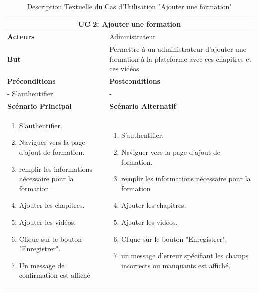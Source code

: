 \begin{table}[h!]
    \centering
    \begin{tabular}{| m{7cm} | m{7cm} |}
    \hline
    \multicolumn{2}{|c|}{\textbf{UC 2:} Ajouter une formation} \\ \hline
    \textbf{Acteurs} &  Administrateur \\ \hline
    \textbf{But} &   Permettre à un administrateur d'ajouter une formation à la plateforme avec ces chapitres et ces vidéos \\ \hline
     \textbf{Préconditions} 
    & 
    \textbf{Postconditions} \\ \hline
    - S'authentifier. & - \\ \hline
    \textbf{Scénario Principal} & \textbf{Scénario Alternatif}
    \\ \hline
    \begin{enumerate}
        \item S'authentifier.
        \item Naviguer vers la page d'ajout de formation.
        \item remplir les informations nécessaire pour la formation
        \item Ajouter les chapitres.
        \item Ajouter les vidéos.
        \item Clique sur le bouton "Enregistrer".
        \item Un message de confirmation est affiché
    \end{enumerate} & 
    \begin{enumerate}
        \item S'authentifier.
        \item Naviguer vers la page d'ajout de formation.
        \item remplir les informations nécessaire pour la formation
        \item Ajouter les chapitres.
        \item Ajouter les vidéos.
        \item Clique sur le bouton "Enregistrer".
        \item un message d'erreur spécifiant les champs incorrects ou manquants est affiché.
    \end{enumerate}
    \\ \hline
    \end{tabular}
    \caption{Description Textuelle du Cas d'Utilisation "Ajouter une formation"}
    \label{tab:use_case_description}
    \end{table}

